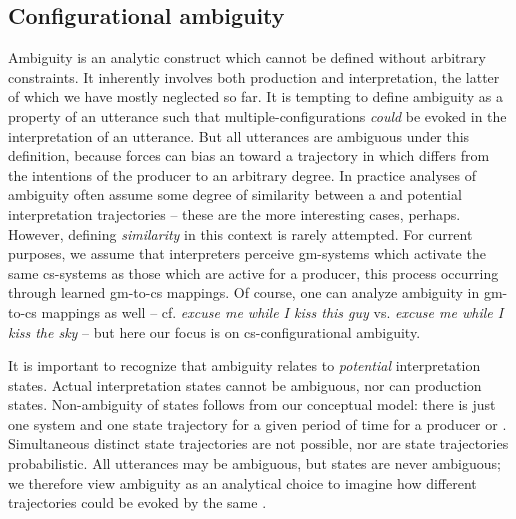 \subsection{Configurational ambiguity}

Ambiguity is an analytic construct which cannot be defined without arbitrary constraints. It inherently involves both production and interpretation, the latter of which we have mostly neglected so far. It is tempting to define ambiguity as a property of an utterance such that multiple-con\-fig\-u\-ra\-tions \textit{could} be evoked in the interpretation of an utterance. But all utterances are ambiguous under this definition, because  forces can bias an  toward a trajectory in which  differs from the intentions of the producer to an arbitrary degree. In practice analyses of ambiguity often assume some degree of similarity between a  and potential interpretation trajectories -- these are the more interesting cases, perhaps. However, defining \textit{similarity} in this context is rarely attempted. For current purposes, we assume that interpreters perceive gm-sys\-tems which activate the same cs-systems as those which are active for a producer, this process occurring through learned gm-to-cs mappings. Of course, one can analyze ambiguity in gm-to-cs mappings as well -- cf. \textit{excuse me while I kiss this guy} vs. \textit{excuse me while I kiss the sky} -- but here our focus is on cs-con\-fig\-u\-ra\-tional ambiguity. 

  It is important to recognize that ambiguity relates to \textit{potential} interpretation states. Actual interpretation states cannot be ambiguous, nor can production states. Non-ambiguity of states follows from our conceptual model: there is just one system and one state trajectory for a given period of time for a producer or . Simultaneous distinct state trajectories are not possible, nor are state trajectories probabilistic. All utterances may be ambiguous, but states are never ambiguous; we therefore view ambiguity as an analytical choice to imagine how different  trajectories could be evoked by the same .

